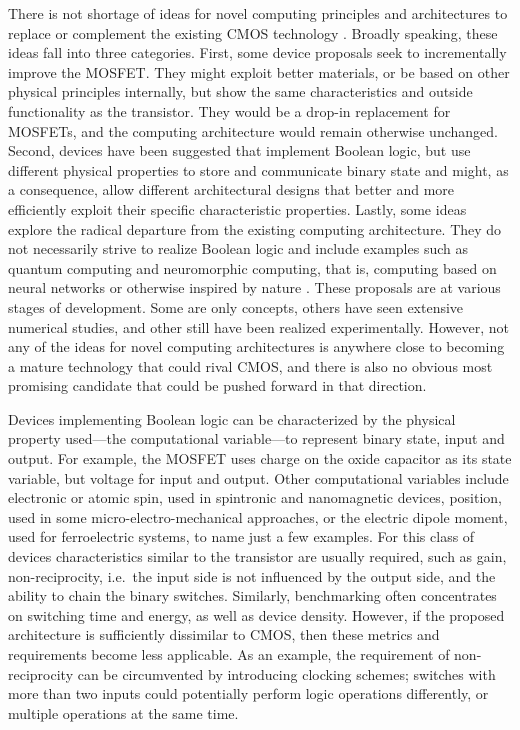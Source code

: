 There is not shortage of ideas for novel computing principles and architectures
to replace or complement the existing CMOS technology \cite{nikonov2013overview} \cite{cavin2012science}. Broadly speaking, these
ideas fall into three categories. First, some device proposals seek to
incrementally improve the MOSFET. They might exploit better materials, or be
based on other physical principles internally, but show the same characteristics
and outside functionality as the transistor. They would be a drop-in replacement
for MOSFETs, and the computing architecture would remain otherwise unchanged.
Second, devices have been suggested that implement Boolean logic, but use
different physical properties to store and communicate binary state and might,
as a consequence, allow different architectural designs that better and more
efficiently exploit their specific characteristic properties. Lastly, some ideas
explore the radical departure from the existing computing architecture. They do
not necessarily strive to realize Boolean logic and include examples such as
quantum computing and neuromorphic computing, that is, computing based on neural
networks or otherwise inspired by nature \cite{mead1990neuromorphic}
\cite{schemmel2010wafer} \cite{furber2012overview}. These proposals are at
various stages of development. Some are only concepts, others have seen
extensive numerical studies, and other still have been realized experimentally.
However, not any of the ideas for novel computing architectures is anywhere
close to becoming a mature technology that could rival CMOS, and there is also
no obvious most promising candidate that could be pushed forward in that
direction.

Devices implementing Boolean logic can be characterized by the physical property
used---the computational variable---to represent binary state, input and output.
For example, the MOSFET uses charge on the oxide capacitor as its state
variable, but voltage for input and output. Other computational variables
include electronic or atomic spin, used in spintronic and nanomagnetic devices,
position, used in some micro-electro-mechanical approaches, or the electric dipole
moment, used for ferroelectric systems, to name just a few examples. For this
class of devices characteristics similar to the transistor are usually required,
such as gain, non-reciprocity, i.e.~the input side is not influenced by the
output side, and the ability to chain the binary switches. Similarly,
benchmarking often concentrates on switching time and energy, as well as device
density. However, if the proposed architecture is sufficiently dissimilar to
CMOS, then these metrics and requirements become less applicable. As an example,
the requirement of non-reciprocity can be circumvented by introducing clocking
schemes; switches with more than two inputs could potentially perform logic
operations differently, or multiple operations at the same time.

